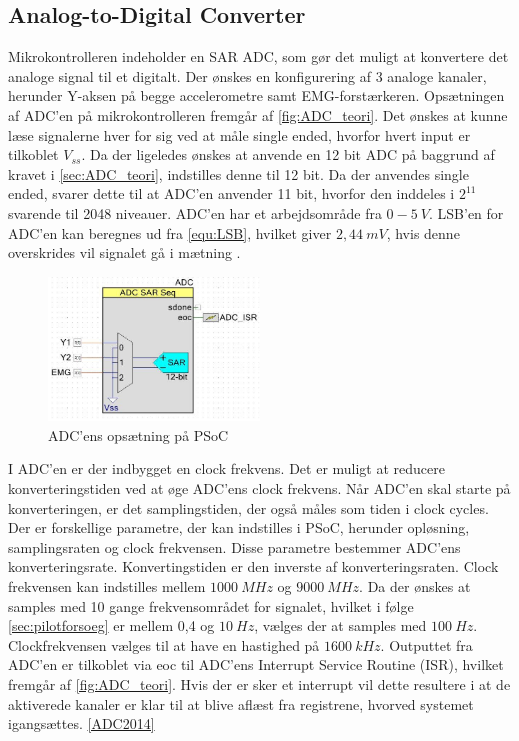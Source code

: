 \subsection{Analog-to-Digital Converter}
Mikrokontrolleren indeholder en SAR ADC, som gør det muligt at konvertere det analoge signal til et digitalt. Der ønskes en konfigurering af 3 analoge kanaler, herunder Y-aksen på begge accelerometre samt EMG-forstærkeren. Opsætningen af ADC'en på mikrokontrolleren fremgår af \autoref{fig:ADC_teori}. Det ønskes at kunne læse signalerne hver for sig ved at måle single ended, hvorfor hvert input er tilkoblet $V_{ss}$. Da der ligeledes ønskes at anvende en 12 bit ADC på baggrund af kravet i \autoref{sec:ADC_teori}, indstilles denne til 12 bit. Da der anvendes single ended, svarer dette til at ADC'en anvender 11 bit, hvorfor den inddeles i $2^{11}$ svarende til 2048 niveauer. ADC'en har et arbejdsområde fra $0-5~V$. LSB'en for ADC'en kan beregnes ud fra \autoref{equ:LSB}, hvilket giver $2,44~mV$, hvis denne overskrides vil signalet gå i mætning \citep{ADC2014}. 


\begin{figure}[H]
\centering
\includegraphics[width=0.5\textwidth]{figures/implementering/ADC_imp.jpg}
\caption{ADC'ens opsætning på PSoC}
\label{fig:ADC_teori}
\end{figure}

I ADC'en er der indbygget en clock frekvens. Det er muligt at reducere konverteringstiden ved at øge ADC'ens clock frekvens. Når ADC'en skal starte på konverteringen, er det samplingstiden, der også måles som tiden i clock cycles. Der er forskellige parametre, der kan indstilles i PSoC, herunder opløsning, samplingsraten og clock frekvensen. Disse parametre bestemmer ADC'ens konverteringsrate. Konvertingstiden er den inverste af konverteringsraten. Clock frekvensen kan indstilles mellem $1000~MHz$ og $9000~MHz$.\citep{ADC2014} Da der ønskes at samples med 10 gange frekvensområdet for signalet, hvilket i følge  \autoref{sec:pilotforsoeg} er mellem 0,4 og $10~Hz$, vælges der at samples med $100~Hz$. Clockfrekvensen vælges til at have en hastighed på $1600~kHz$. Outputtet fra ADC'en er tilkoblet via eoc til ADC'ens Interrupt Service Routine (ISR), hvilket fremgår af \autoref{fig:ADC_teori}. Hvis der er sker et interrupt vil dette resultere i at de aktiverede kanaler er klar til at blive aflæst fra registrene, hvorved systemet igangsættes. \autoref{ADC2014} 


